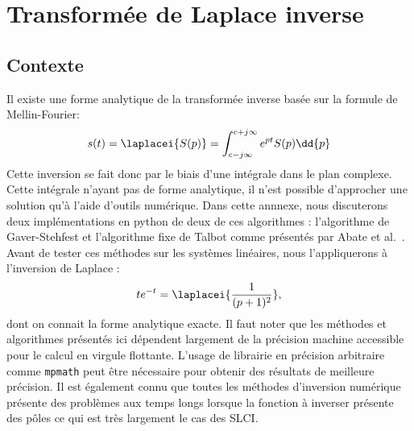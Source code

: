 \chapter{Transformée de Laplace inverse~\label{annexe-invL}}

\section{Contexte}
Il existe une forme analytique de la transformée inverse basée sur
la formule de Mellin-Fourier\cite{Ostertag}:
\[
s(t)=\laplacei{S(p)}=\int_{c-j\infty}^{c+j\infty} e^{pt}S(p)\dd{p}
\]
Cette inversion se fait donc par le biais d'une intégrale dans le plan
complexe. Cette intégrale n'ayant pas de forme analytique, il n'est possible 
d'approcher une solution qu'à l'aide d'outils numérique. 
Dans cette annnexe, nous discuterons deux implémentations en python de 
deux de ces algorithmes : 
l'algorithme de Gaver-Stehfest et l'algorithme fixe de Talbot comme présentés
par Abate et al.~\cite{abate2004,abate2006,frwiki:200676411}.
Avant de tester ces méthodes sur les systèmes linéaires, nous l'appliquerons
à l'inversion de Laplace :  
\[
    te^{-t}=\laplacei{\dfrac{1}{(p+1)^2}},
\]
dont on connait la forme analytique exacte.
Il faut noter que les méthodes et algorithmes présentés ici dépendent 
largement de la précision machine accessible pour le calcul en virgule flottante.
L'usage de librairie en précision arbitraire comme \texttt{mpmath} peut être 
nécessaire pour obtenir des résultats de meilleure précision. Il est également
connu que toutes les méthodes d'inversion numérique présente des problèmes
aux temps longs lorsque la fonction à inverser présente des pôles ce qui 
est très largement le cas des SLCI.
